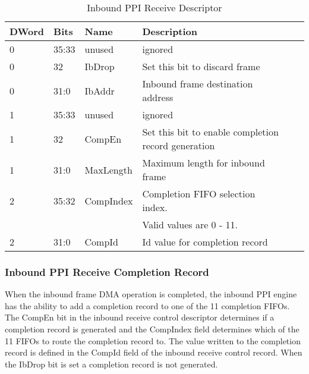 \documentclass[11pt]{article}
\begin{document}
\begin{table}[H]
\small
\centering
   \begin{tabular}{| l | l | l | l | l | l | } 
      \hline \textbf{DWord} & \textbf{Bits} & \textbf{Name} & \textbf{Description} \\
      \hline 0              & 35:33         & unused        & ignored                           \\
      \hline 0              & 32            & IbDrop        & Set this bit to discard frame     \\
      \hline 0              & 31:0          & IbAddr        & Inbound frame destination address \\
      \hline 1              & 35:33         & unused        & ignored                           \\
      \hline 1              & 32            & CompEn        & Set this bit to enable completion record generation \\
      \hline 1              & 31:0          & MaxLength     & Maximum length for inbound frame  \\
      \hline 2              & 35:32         & CompIndex     & Completion FIFO selection index.  \\
                            &               &               & Valid values are 0 - 11.          \\
      \hline 2              & 31:0          & CompId        & Id value for completion record    \\
      \hline
   \end{tabular}
   \caption{Inbound PPI Receive Descriptor}
   \label{tab:ib_ppi_cntrl}
\end{table}

\subsubsection{Inbound PPI Receive Completion Record}

When the inbound frame DMA operation is completed, the inbound PPI engine has the ability to add a completion record to one of the 11 
completion FIFOs. The CompEn bit in the inbound receive control descriptor determines if a completion record is 
generated and the CompIndex field determines which of the 11 FIFOs to route the completion record to. The value written 
to the completion record is defined in the CompId field of the inbound receive control record. When the IbDrop bit is set
a completion record is not generated.
\end{document}
